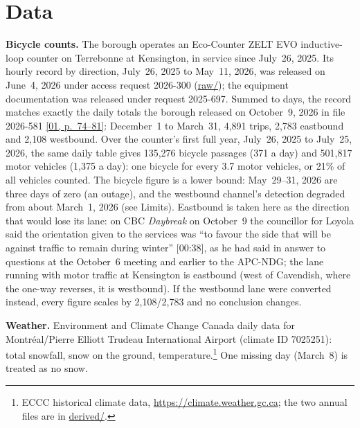 \documentclass[11pt,letterpaper]{article}
\newcommand{\repourl}{https://github.com/OpenMobilityData/Terrebonne-access-requests}
\newcommand{\doc}[2]{\href{\repourl/blob/main/#1}{#2}}
\newcommand{\pagesurl}{https://openmobilitydata.github.io/Terrebonne-access-requests}
\newcommand{\pgl}[3]{\href{\pagesurl/\csname bundle#1\endcsname\#page=#2}{\textsf{\small[#1, p.~#3]}}}
\begin{document}
\section{Data}

\textbf{Bicycle counts.} The borough operates an Eco-Counter ZELT EVO
inductive-loop counter on Terrebonne at Kensington, in service since
July~26, 2025. Its hourly record by direction, July~26, 2025 to May~11,
2026, was released on June~4, 2026 under access request 2026-300
(\doc{2026-300/raw/}{raw/}); the equipment documentation was released under
request 2025-697. Summed to days, the record matches exactly the daily
totals the borough released on October~9, 2026 in file 2026-581
\pgl{01}{74}{74--81}: December~1 to March~31, 4{,}891 trips, 2{,}783
eastbound and 2{,}108 westbound. Over the counter's first full year,
July~26, 2025 to July~25, 2026, the same daily table gives 135{,}276
bicycle passages (371 a day) and 501{,}817 motor vehicles (1{,}375 a
day): one bicycle for every 3.7 motor vehicles, or 21\% of all vehicles
counted. The bicycle figure is a lower bound: May~29--31, 2026 are three
days of zero (an outage), and the westbound channel's detection degraded
from about March~1, 2026 (see Limits). Eastbound is taken here as the direction
that would lose its lane: on CBC \emph{Daybreak} on October~9 the
councillor for Loyola said the orientation given to the services was ``to
favour the side that will be against traffic to remain during winter''
[00:38], as he had said in answer to questions at the October~6 meeting
and earlier to the APC-NDG; the lane running with motor traffic at
Kensington is eastbound (west of Cavendish, where the one-way reverses, it
is westbound). If the westbound lane were converted instead,
every figure scales by 2{,}108/2{,}783 and no conclusion changes.

\textbf{Weather.} Environment and Climate Change Canada daily data for
Montr\'eal/Pierre Elliott Trudeau International Airport (climate ID
7025251): total snowfall, snow on the ground, temperature.\footnote{ECCC
historical climate data, \url{https://climate.weather.gc.ca}; the two
annual files are in \doc{2026-300/derived/}{derived/}.} One missing day
(March~8) is treated as no snow.
\end{document}
